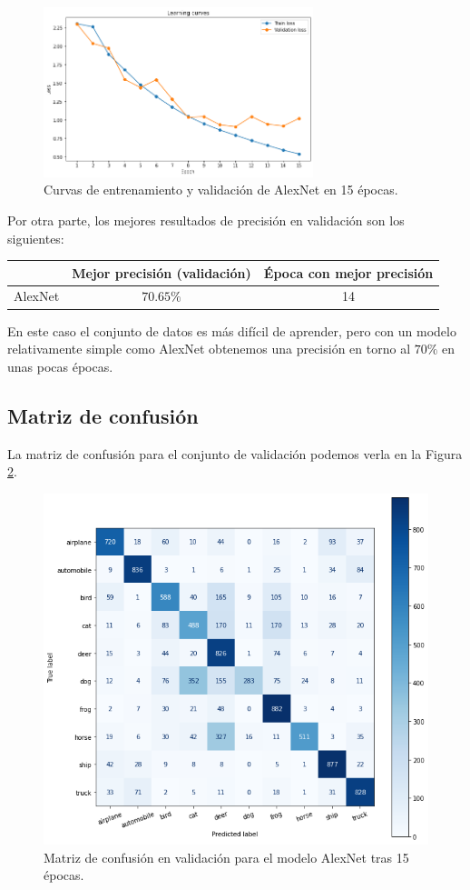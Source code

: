 \documentclass[11pt]{article}
\begin{document}
\begin{figure}[h!]
  \centering
  \includegraphics[width=0.7\textwidth]{img/2_learning_curves}
  \caption{Curvas de entrenamiento y validación de AlexNet en 15 épocas.}
  \label{fig:2_curvas}
\end{figure}

Por otra parte, los mejores resultados de precisión en validación son los siguientes:

\begin{table}[h!]
  \centering
  \begin{tabular}{c|cc}
    & Mejor precisión (validación) & Época con mejor precisión\\
    \hline
    AlexNet & $70.65\%$ & 14
  \end{tabular}
\end{table}

En este caso el conjunto de datos es más difícil de aprender, pero con un modelo relativamente simple como AlexNet obtenemos una precisión en torno al $70\%$ en unas pocas épocas.

\subsection*{Matriz de confusión}

La matriz de confusión para el conjunto de validación podemos verla en la Figura \ref{fig:2_confusion}.

\begin{figure}[h!]
  \centering
  \includegraphics[width=.55\textwidth]{img/2_confusion_matrix}
  \caption{Matriz de confusión en validación para el modelo AlexNet tras 15 épocas.}
  \label{fig:2_confusion}
\end{figure}
\end{document}
